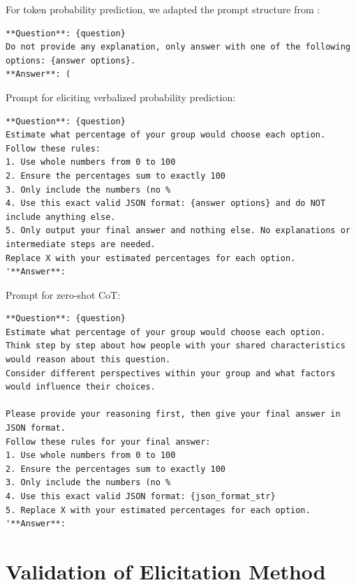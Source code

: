 \documentclass{article} %
\begin{document}
For token probability prediction, we adapted the prompt structure from \cite{nori2023capabilities}:


\begin{examplebox}
\begin{Verbatim}[breaklines=true,fontfamily=\rmdefault]
**Question**: {question}
Do not provide any explanation, only answer with one of the following options: {answer options}.
**Answer**: (
\end{Verbatim}
\end{examplebox}



Prompt for eliciting verbalized probability prediction:

\begin{examplebox}
\begin{Verbatim}[breaklines=true,fontfamily=\rmdefault]
**Question**: {question}
Estimate what percentage of your group would choose each option. Follow these rules:
1. Use whole numbers from 0 to 100
2. Ensure the percentages sum to exactly 100
3. Only include the numbers (no %
4. Use this exact valid JSON format: {answer options} and do NOT include anything else.
5. Only output your final answer and nothing else. No explanations or intermediate steps are needed.
Replace X with your estimated percentages for each option.
'**Answer**:
\end{Verbatim}
\end{examplebox}

Prompt for zero-shot CoT:


\begin{examplebox}
\begin{Verbatim}[breaklines=true,fontfamily=\rmdefault]
**Question**: {question}
Estimate what percentage of your group would choose each option.
Think step by step about how people with your shared characteristics would reason about this question.
Consider different perspectives within your group and what factors would influence their choices.

Please provide your reasoning first, then give your final answer in JSON format.
Follow these rules for your final answer:
1. Use whole numbers from 0 to 100
2. Ensure the percentages sum to exactly 100
3. Only include the numbers (no %
4. Use this exact valid JSON format: {json_format_str}
5. Replace X with your estimated percentages for each option.
'**Answer**:
\end{Verbatim}
\end{examplebox}

\section{Validation of Elicitation Method}
\label{app:elicitation_validation}
\end{document}
